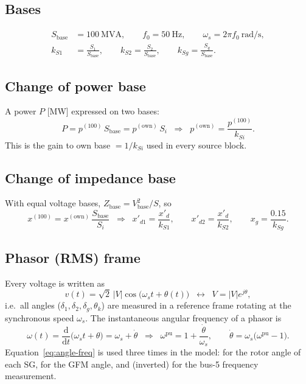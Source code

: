 \documentclass[11pt,a4paper]{article}
\numberwithin{equation}{section}
\newcommand{\dd}{\mathrm{d}}
\newcommand{\blk}[1]{\textsf{#1}}
\begin{document}
\subsection{Bases}
\begin{align}
S_{\text{base}} &= 100~\text{MVA}, \qquad f_0 = 50~\text{Hz}, \qquad \omega_s = 2\pi f_0~\text{rad/s},\\
k_{S1} &= \frac{S_1}{S_{\text{base}}},\qquad k_{S2} = \frac{S_2}{S_{\text{base}}},\qquad k_{Sg} = \frac{S_g}{S_{\text{base}}}.
\end{align}

\subsection{Change of power base}
A power $P$ [MW] expressed on two bases:
\begin{equation}
P = p^{(100)}\,S_{\text{base}} = p^{(\text{own})}\,S_i
\;\;\Longrightarrow\;\;
p^{(\text{own})} = \frac{p^{(100)}}{k_{Si}} .
\end{equation}
This is the gain \blk{to own base} $=1/k_{Si}$ used in every source block.

\subsection{Change of impedance base}
With equal voltage bases, $Z_{\text{base}} = V_{\text{base}}^2/S$, so
\begin{equation}
x^{(100)} = x^{(\text{own})}\,\frac{S_{\text{base}}}{S_i}
\;\;\Longrightarrow\;\;
x'_{d1} = \frac{x'_d}{k_{S1}},\qquad x'_{d2} = \frac{x'_d}{k_{S2}},\qquad x_g = \frac{0.15}{k_{Sg}} .
\end{equation}


\subsection{Phasor (RMS) frame}
Every voltage is written as
\begin{equation}
v(t) = \sqrt{2}\,|V|\cos\!\big(\omega_s t + \theta(t)\big)
\;\;\longleftrightarrow\;\;
V = |V|e^{j\theta},
\end{equation}
i.e.\ all angles ($\delta_1,\delta_2,\delta_g,\theta_k$) are measured in a reference frame rotating at the synchronous speed $\omega_s$.
The instantaneous angular frequency of a phasor is
\begin{equation}
\omega(t) = \frac{\dd}{\dd t}\big(\omega_s t + \theta\big) = \omega_s + \dot\theta
\;\;\Longrightarrow\;\;
\omega^{\text{pu}} = 1 + \frac{\dot\theta}{\omega_s},
\qquad
\dot\theta = \omega_s\big(\omega^{\text{pu}} - 1\big).
\label{eq:angle-freq}
\end{equation}
Equation~\eqref{eq:angle-freq} is used three times in the model: for the rotor angle of each SG, for the GFM angle, and (inverted) for the bus-5 frequency measurement.
\end{document}
